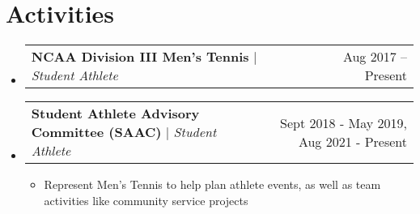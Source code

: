\documentclass[letterpaper,11pt]{article}
\makeatletter
\newcommand{\resumeItem}[1]{
  \item\small{
    {#1 \vspace{-2pt}}
  }
}
\newcommand{\resumeProjectHeading}[2]{
    \item
    \begin{tabular*}{0.97\textwidth}{l@{\extracolsep{\fill}}r}
      \small#1 & #2 \\
    \end{tabular*}\vspace{-7pt}
}
\newcommand{\resumeSubHeadingListStart}{\begin{itemize}[leftmargin=0.15in, label={}]}
\newcommand{\resumeSubHeadingListEnd}{\end{itemize}}
\newcommand{\resumeItemListStart}{\begin{itemize}}
\newcommand{\resumeItemListEnd}{\end{itemize}\vspace{-5pt}}
\makeatother
\begin{document}
\section{Activities}
 \resumeSubHeadingListStart
      \resumeProjectHeading
          {\textbf{NCAA Division III Men's Tennis} $|$ \emph{Student Athlete}}{Aug 2017 -- Present}
      \resumeProjectHeading
          {\textbf{Student Athlete Advisory Committee (SAAC)} $|$ \emph{Student Athlete}}{Sept 2018 - May 2019, Aug 2021 - Present}
          \resumeItemListStart
            \resumeItem{Represent Men's Tennis to help plan athlete events, as well as team activities like community service projects}
          \resumeItemListEnd
    \resumeSubHeadingListEnd

\end{document}
